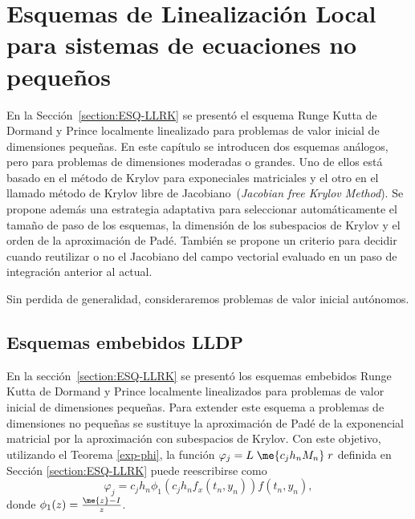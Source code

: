 \chapter{Esquemas de Linealizaci\'on Local para sistemas de ecuaciones no pequeños}\label{chapter:SCHEME}

En la Secci\'on~\ref{section:ESQ-LLRK} se present\'o el esquema Runge Kutta de Dormand y Prince localmente linealizado
para problemas de valor inicial de dimensiones peque\~nas. En este capítulo se introducen dos esquemas an\'alogos, pero
para problemas de dimensiones moderadas o grandes. Uno de ellos est\'a basado en el m\'etodo de Krylov para
exponeciales matriciales y el otro  en el llamado m\'etodo de Krylov libre de Jacobiano~(\emph{Jacobian free Krylov Method}). Se propone adem\'as una estrategia adaptativa para seleccionar autom\'aticamente el tama\~no de paso de los esquemas, la dimensi\'on de los subespacios de Krylov y el orden de la  aproximaci\'on de Pad\'e. También se propone un criterio para decidir cuando reutilizar o no el Jacobiano del campo vectorial evaluado en un paso de integración anterior al actual. 

Sin perdida de generalidad, consideraremos problemas de valor inicial autónomos.
\section{Esquemas embebidos LLDP\label{KRLOV-PADE}}

En la secci\'on~\ref{section:ESQ-LLRK} se present\'o los esquemas embebidos  Runge Kutta de Dormand y Prince localmente linealizados
para problemas de valor inicial de  dimensiones peque\~nas. Para extender este esquema a problemas de dimensiones no pequeñas se sustituye la aproximaci\'on de Pad\'e de la exponencial matricial por la aproximaci\'on con subespacios
de Krylov. Con este objetivo, utilizando el 
Teorema \ref{exp-phi}, la función $\varphi_j=L\;\me{c_{j}h_{n}M_{n}}\;r$ definida en Sección \ref{section:ESQ-LLRK} puede reescribirse como
\[\varphi_j=c_jh_n\phi_1(c_jh_nf_x(t_n,y_n))f(t_n,y_n),\]
donde  $\phi_1(z)=\frac{\me{z}-I}{z}$. 

